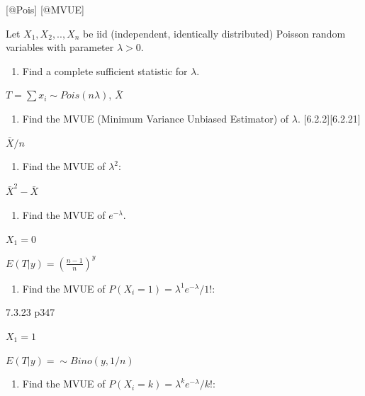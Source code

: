 \documentclass[6pt,twocolumn,Portrait]{article}
\providecommand{\tightlist}{%
  \setlength{\itemsep}{0pt}\setlength{\parskip}{0pt}}
\begin{document}
{[}@Pois{]} {[}@MVUE{]}

Let \(X_1,X_2,..,X_n\) be iid (independent, identically distributed)
Poisson random variables with parameter \(\lambda>0\).

\begin{enumerate}
\def\labelenumi{(\alph{enumi})}
\tightlist
\item
  Find a complete sufficient statistic for \(\lambda\).
\end{enumerate}

\(T=\sum x_i\sim Pois(n\lambda)\), \(\bar X\)

\begin{enumerate}
\def\labelenumi{(\alph{enumi})}
\setcounter{enumi}{1}
\tightlist
\item
  Find the MVUE (Minimum Variance Unbiased Estimator) of \(\lambda\).
  {[}6.2.2{]}{[}6.2.21{]}
\end{enumerate}

\(\bar X/n\)

\begin{enumerate}
\def\labelenumi{(\alph{enumi})}
\setcounter{enumi}{2}
\tightlist
\item
  Find the MVUE of \(\lambda^2\):
\end{enumerate}

\(\bar X^2-\bar X\)

\begin{enumerate}
\def\labelenumi{(\alph{enumi})}
\setcounter{enumi}{3}
\tightlist
\item
  Find the MVUE of \(e^{-\lambda}\).
\end{enumerate}

\(X_1=0\)

\(E(T|y)=(\frac{n-1}{n})^y\)

\begin{enumerate}
\def\labelenumi{(\alph{enumi})}
\setcounter{enumi}{4}
\tightlist
\item
  Find the MVUE of \(P(X_i=1)=\lambda^1e^{-\lambda}/1!\):
\end{enumerate}

7.3.23 p347

\(X_1=1\)

\(E(T|y)= \sim Bino(y,1/n)\)

\begin{enumerate}
\def\labelenumi{(\alph{enumi})}
\setcounter{enumi}{5}
\tightlist
\item
  Find the MVUE of \(P(X_i=k)=\lambda^ke^{-\lambda}/k!\):
\end{enumerate}
\end{document}
